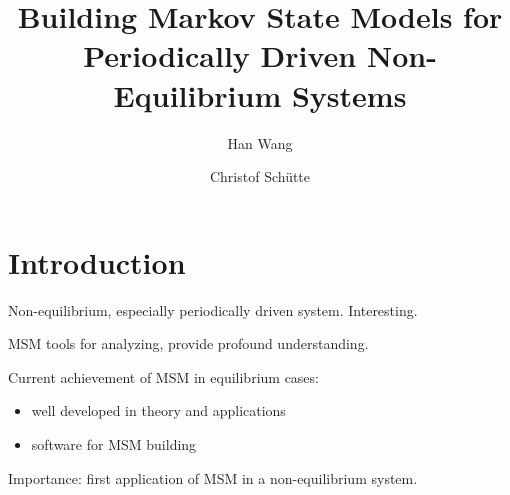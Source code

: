 \documentclass[aps, pre, preprint,unsortedaddress,a4paper,onecolumn]{revtex4}
\begin{document}
\title{Building Markov State Models for Periodically Driven Non-Equilibrium Systems}
\author{Han Wang}
\author{Christof Sch\"utte}
   
\begin{abstract}
\end{abstract}

\maketitle

\section{Introduction}
Non-equilibrium, especially periodically driven system. Interesting.

MSM tools for analyzing, provide profound understanding.

Current achievement of MSM in equilibrium cases:
\begin{itemize}
\item well developed in theory and applications \cite{A19-31, A19-1}
\item software for MSM building \cite{A19-49, MSMBuilder}
\end{itemize}

Importance: first application of MSM in a non-equilibrium system.

\end{document}
